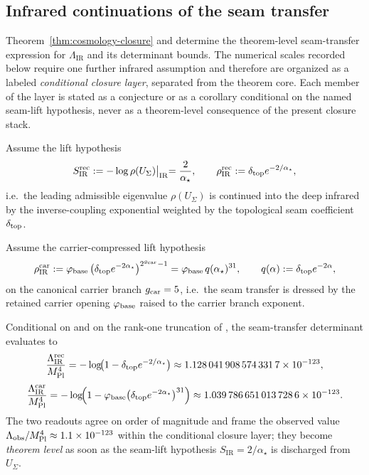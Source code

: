 \subsection{Infrared continuations of the seam transfer}
\label{app:ir-seam-continuations}

Theorem~\ref{thm:cosmology-closure} and  determine the
theorem-level seam-transfer expression for $\Lambda_{\mathrm{IR}}$ and its determinant bounds.
The numerical scales recorded below require one further infrared assumption and therefore are
organized as a labeled \emph{conditional closure layer}, separated from the theorem core. Each
member of the layer is stated as a conjecture or as a corollary conditional on the named seam-lift
hypothesis, never as a theorem-level consequence of the present closure stack.

\begin{conjecture}
\label{conj:ir-seam-rec-continuation}
Assume the lift hypothesis
\[
S_{\mathrm{IR}}^{\mathrm{rec}}
:=
-\log\rho(U_\Sigma)\bigl|_{\mathrm{IR}}
=
\frac{2}{\alpha_\star},
\qquad
\rho_{\mathrm{IR}}^{\mathrm{rec}}
:=
\delta_{\mathrm{top}} e^{-2/\alpha_\star},
\]
i.e.\ the leading admissible eigenvalue $\rho(U_\Sigma)$ is continued into the deep infrared by the
inverse-coupling exponential weighted by the topological seam coefficient $\delta_{\mathrm{top}}$.
\end{conjecture}

\begin{conjecture}
\label{conj:ir-seam-car-continuation}
Assume the carrier-compressed lift hypothesis
\[
\rho_{\mathrm{IR}}^{\mathrm{car}}
:=
\varphi_{\mathrm{base}}\,\bigl(\delta_{\mathrm{top}} e^{-2\alpha_\star}\bigr)^{2^{g_{\mathrm{car}}}-1}
=
\varphi_{\mathrm{base}}\,q(\alpha_\star)^{31},
\qquad
q(\alpha):=\delta_{\mathrm{top}} e^{-2\alpha},
\]
on the canonical carrier branch $g_{\mathrm{car}}=5$, i.e.\ the seam transfer is dressed by the retained
carrier opening $\varphi_{\mathrm{base}}$ raised to the carrier branch exponent.
\end{conjecture}

\begin{corollary}
\label{cor:conditional-lambda-ir-readout}
Conditional on  and on the
rank-one truncation of , the seam-transfer determinant evaluates
to
\[
\frac{\Lambda_{\mathrm{IR}}^{\mathrm{rec}}}{M_{\mathrm{Pl}}^4}
=
-\log\!\bigl(1-\delta_{\mathrm{top}} e^{-2/\alpha_\star}\bigr)
\approx
\num{1.1280419085743317e-123},
\]
\[
\frac{\Lambda_{\mathrm{IR}}^{\mathrm{car}}}{M_{\mathrm{Pl}}^4}
=
-\log\!\Bigl(1-\varphi_{\mathrm{base}}\bigl(\delta_{\mathrm{top}} e^{-2\alpha_\star}\bigr)^{31}\Bigr)
\approx
\num{1.0397866510137286e-123}.
\]
The two readouts agree on order of magnitude and frame the observed value
$\Lambda_{\mathrm{obs}}/M_{\mathrm{Pl}}^4\approx\num{1.1e-123}$ within the conditional closure layer; they
become \emph{theorem level} as soon as the seam-lift hypothesis $S_{\mathrm{IR}}=2/\alpha_\star$ is
discharged from $U_\Sigma$.
\end{corollary}

